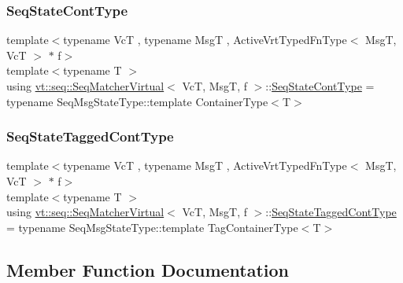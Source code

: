 \subsubsection{\texorpdfstring{Seq\+State\+Cont\+Type}{SeqStateContType}}
{\footnotesize\ttfamily template$<$typename VcT , typename MsgT , Active\+Vrt\+Typed\+Fn\+Type$<$ Msg\+T, Vc\+T $>$ $\ast$ f$>$ \\
template$<$typename T $>$ \\
using \hyperlink{structvt_1_1seq_1_1_seq_matcher_virtual}{vt\+::seq\+::\+Seq\+Matcher\+Virtual}$<$ VcT, MsgT, f $>$\+::\hyperlink{structvt_1_1seq_1_1_seq_matcher_virtual_a1ce5abe53e93d69d1b487e97fd30fdbd}{Seq\+State\+Cont\+Type} =  typename Seq\+Msg\+State\+Type\+::template Container\+Type$<$T$>$}

\mbox{\label{structvt_1_1seq_1_1_seq_matcher_virtual_ab6b75c420d0d3e46e729188d07c11ff2}} 
\subsubsection{\texorpdfstring{Seq\+State\+Tagged\+Cont\+Type}{SeqStateTaggedContType}}
{\footnotesize\ttfamily template$<$typename VcT , typename MsgT , Active\+Vrt\+Typed\+Fn\+Type$<$ Msg\+T, Vc\+T $>$ $\ast$ f$>$ \\
template$<$typename T $>$ \\
using \hyperlink{structvt_1_1seq_1_1_seq_matcher_virtual}{vt\+::seq\+::\+Seq\+Matcher\+Virtual}$<$ VcT, MsgT, f $>$\+::\hyperlink{structvt_1_1seq_1_1_seq_matcher_virtual_ab6b75c420d0d3e46e729188d07c11ff2}{Seq\+State\+Tagged\+Cont\+Type} =  typename Seq\+Msg\+State\+Type\+::template Tag\+Container\+Type$<$T$>$}



\subsection{Member Function Documentation}
\mbox{\label{structvt_1_1seq_1_1_seq_matcher_virtual_a1679c1eba073362e70808fb89a174c6c}} 
